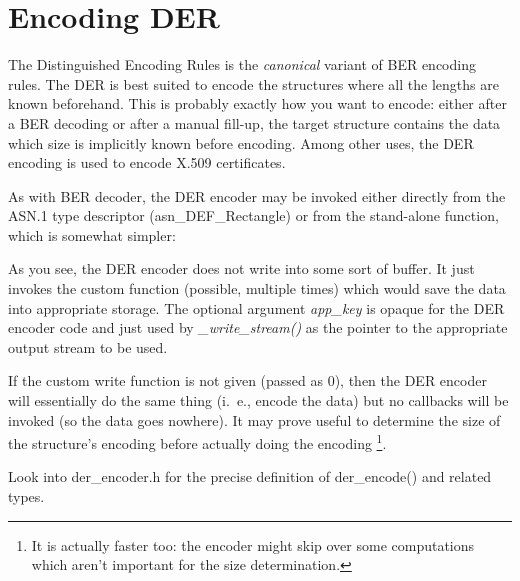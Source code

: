 \documentclass[english,oneside,12pt]{book}
\begin{document}
\section{\label{sec:Encoding-DER}Encoding DER}

The Distinguished Encoding Rules is the \emph{canonical} variant of
BER encoding rules. The DER is best suited to encode the structures
where all the lengths are known beforehand. This is probably exactly
how you want to encode: either after a BER decoding or after a manual
fill-up, the target structure contains the data which size is implicitly
known before encoding. Among other uses, the DER encoding is used
to encode X.509 certificates.

As with BER decoder, the DER encoder may be invoked either directly
from the ASN.1 type descriptor (asn\_DEF\_Rectangle) or from the stand-alone
function, which is somewhat simpler:
As you see, the DER encoder does not write into some sort of buffer.
It just invokes the custom function (possible, multiple
times) which would save the data into appropriate storage. The optional
argument \emph{app\_key} is opaque for the DER encoder code and just
used by \emph{\_write\_stream()} as the pointer to the appropriate
output stream to be used.

If the custom write function is not given (passed as 0), then the
DER encoder will essentially do the same thing (i.~e., encode the data)
but no callbacks will be invoked (so the data goes nowhere). It may
prove useful to determine the size of the structure's encoding before
actually doing the encoding%
\footnote{It is actually faster too: the encoder might skip over some computations
which aren't important for the size determination.%
}.

Look into der\_encoder.h for the precise definition of der\_encode()
and related types.
\end{document}
